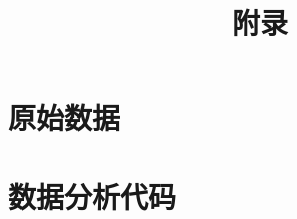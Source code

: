 \documentclass[aps,twocolumn,prl,amsmath,amssymb,floatfix,superscriptaddress]{revtex4-1}
\begin{document}
\title{\large 附录}
\maketitle
\onecolumngrid
\setcounter{figure}{0}
\renewcommand{\thefigure}{S\arabic{figure}}

\section{\large 原始数据}
\section{\large 数据分析代码}
\end{document}
